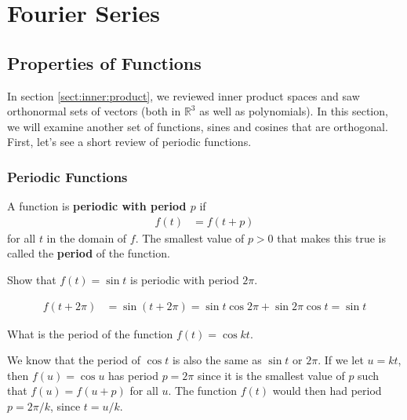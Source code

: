 
\chapter{Fourier Series}   \label{ch:fourier:series}
 
\section{Properties of Functions}

In section \ref{sect:inner:product}, we reviewed inner product spaces and saw orthonormal sets of vectors (both in $\mathbb{R}^3$ as well as polynomials).  In this section, we will examine another set of functions, sines and cosines that are orthogonal.  First, let's see a short review of periodic functions.  

\subsection{Periodic Functions}


\begin{definition}
A function is \textbf{periodic with period $p$} if
% 
\begin{align*}
f(t) & = f(t+p)
\end{align*}
for all $t$ in the domain of $f$.  The smallest value of $p>0$ that makes this true is called the \textbf{period} of the function.  
\end{definition}

\begin{example}
Show that $f(t) = \sin t$ is periodic with period $2\pi$.  

\solution

\begin{align*}
f(t+2\pi) & = \sin (t + 2 \pi) = \sin t \cos 2\pi + \sin 2\pi \cos t = \sin t 
\end{align*}
\end{example}

\begin{example}
What is the period of the function $f(t) = \cos kt$.

\solution

We know that the period of $\cos t$ is also the same as $\sin t$ or $2\pi$.  If we let $u=kt$, then $f(u)=\cos u$ has period $p=2\pi$ since it is the smallest value of $p$ such that $f(u)=f(u+p)$ for all $u$.  The function $f(t)$ would then had period $p=2\pi/k$, since $t=u/k$.  

\end{example}

